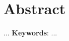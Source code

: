 \chapter*{\hspace{6.2cm}Abstract}\label{chp:abstract}
\thispagestyle{headings}
\thispagestyle{empty} 

{
...
\textbf{Keywords}: ...
}